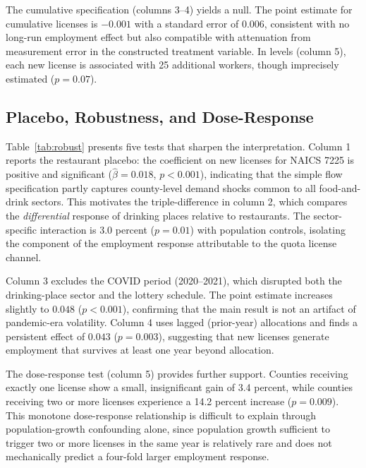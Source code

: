 \documentclass[12pt]{article}
\begin{document}
The cumulative specification (columns 3--4) yields a null. The point estimate for cumulative licenses is $-0.001$ with a standard error of $0.006$, consistent with no long-run employment effect but also compatible with attenuation from measurement error in the constructed treatment variable. In levels (column 5), each new license is associated with 25 additional workers, though imprecisely estimated ($p = 0.07$).



\subsection{Placebo, Robustness, and Dose-Response}

Table~\ref{tab:robust} presents five tests that sharpen the interpretation. Column 1 reports the restaurant placebo: the coefficient on new licenses for NAICS 7225 is positive and significant ($\hat{\beta} = 0.018$, $p < 0.001$), indicating that the simple flow specification partly captures county-level demand shocks common to all food-and-drink sectors. This motivates the triple-difference in column 2, which compares the \textit{differential} response of drinking places relative to restaurants. The sector-specific interaction is 3.0 percent ($p = 0.01$) with population controls, isolating the component of the employment response attributable to the quota license channel.

Column 3 excludes the COVID period (2020--2021), which disrupted both the drinking-place sector and the lottery schedule. The point estimate increases slightly to $0.048$ ($p < 0.001$), confirming that the main result is not an artifact of pandemic-era volatility. Column 4 uses lagged (prior-year) allocations and finds a persistent effect of $0.043$ ($p = 0.003$), suggesting that new licenses generate employment that survives at least one year beyond allocation.

The dose-response test (column 5) provides further support. Counties receiving exactly one license show a small, insignificant gain of 3.4 percent, while counties receiving two or more licenses experience a 14.2 percent increase ($p = 0.009$). This monotone dose-response relationship is difficult to explain through population-growth confounding alone, since population growth sufficient to trigger two or more licenses in the same year is relatively rare and does not mechanically predict a four-fold larger employment response.


\end{document}
